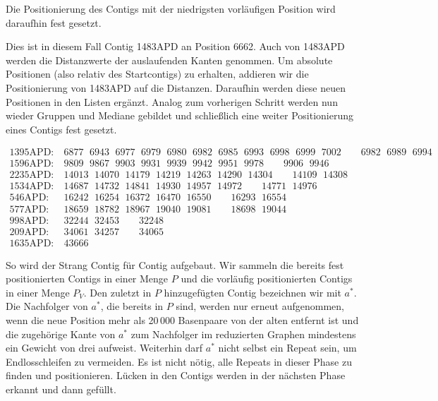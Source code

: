 Die Positionierung des Contigs mit der niedrigsten vorläufigen Position wird daraufhin fest gesetzt.

Dies ist in diesem Fall Contig 1483APD an Position 6662. Auch von 1483APD werden die Distanzwerte der auslaufenden Kanten genommen. 
Um absolute Positionen (also relativ des Startcontigs) zu erhalten, addieren wir die Positionierung von 1483APD auf die Distanzen. Daraufhin werden diese neuen Positionen in den Listen ergänzt. Analog zum vorherigen Schritt werden nun wieder Gruppen und Mediane gebildet und schließlich eine weiter Positionierung eines Contigs fest gesetzt.

\begin{footnotesize}
\begin{align*}
\text{1395APD:}&\ 6877\ \ \,6943\ \ \,6977\ \ \,6979\ \ \,6980\ \ \,6982\ \ \,6985\ \ \,6993\ \ \,6998\ \ \,6999\ \ \,7002\quad\quad 6982\ \ \, 6989\ \ \,6994\\
\text{1596APD:}&\ 9809\ \ \,9867\ \ \,9903\ \ \,9931\ \ \,9939\ \ \,9942\ \ \,9951\ \ \,9978\quad\quad 9906\ \ \,9946\\
\text{2235APD:}&\ 14013\ \ \,14070\ \ \,14179\ \ \,14219\ \ \,14263\ \ \,14290\ \ \,14304\quad\quad 14109\ \ \,14308\\
\text{1534APD:}&\ 14687\ \ \,14732\ \ \,14841\ \ \,14930\ \ \,14957\ \ \,14972\quad\quad 14771\ \ \,14976\\
\text{546APD:}&\ 16242\ \ \,16254\ \ \,16372\ \ \,16470\ \ \,16550\quad\quad 16293\ \ \,16554\\
\text{577APD:}&\ 18659\ \ \,18782\ \ \,18967\ \ \,19040\ \ \,19081\quad\quad 18698\ \ \,19044\\
\text{998APD:}&\ 32244\ \ \,32453\quad\quad 32248\\
\text{209APD:}&\ 34061\ \ \,34257\quad\quad 34065\\
\text{1635APD:}&\ 43666
\end{align*}
\end{footnotesize}

So wird der Strang Contig für Contig aufgebaut. Wir sammeln die bereits fest positionierten Contigs in einer Menge $P$ und die vorläufig positionierten Contigs in einer Menge $P_V$. %
Den zuletzt in $P$ hinzugefügten Contig bezeichnen wir mit $a^*$.
Die Nachfolger von $a^*$, die bereits in $P$ sind, werden 
nur erneut aufgenommen, wenn die neue Position mehr als 20\,000 Basenpaare von der alten entfernt ist und die zugehörige Kante von $a^*$ zum Nachfolger im reduzierten Graphen mindestens ein Gewicht von drei aufweist. 
Weiterhin darf $a^*$ nicht selbst ein Repeat sein, um Endlosschleifen zu vermeiden.
Es ist nicht nötig, alle Repeats in dieser Phase zu finden und positionieren. Lücken in den Contigs werden in der nächsten Phase erkannt und dann 
gefüllt.


